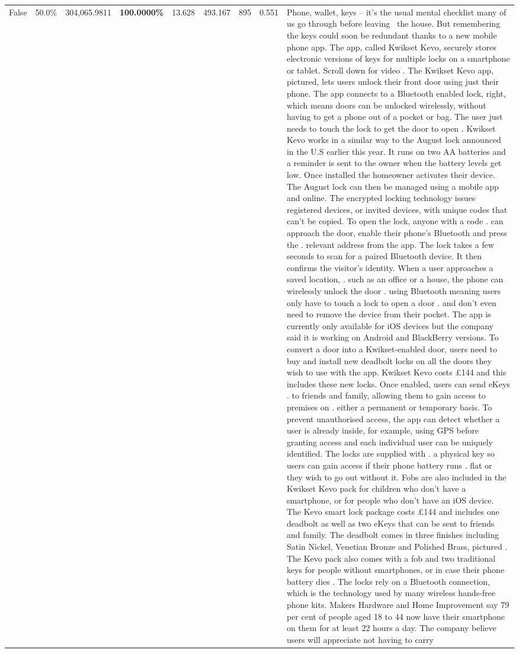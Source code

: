 \begin{table}[H]
\begin{tabular}{lllrlllll}
False & 50.0\% & \color{red} 304,065.9811 & \bfseries \color{red} 100.0000\% & 13.628 & 493.167 & 895 & 0.551 & Phone, wallet, keys – it’s the usual mental checklist many of us go through before leaving  the house. But remembering the keys could soon be redundant thanks to a new mobile phone app. The app, called Kwikset Kevo, securely stores electronic versions of keys for multiple locks on a smartphone or tablet. Scroll down for video . The Kwikset Kevo app, pictured, lets users unlock their front door using just their phone. The app connects to a Bluetooth enabled lock, right, which means doors can be unlocked wirelessly, without having to get a phone out of a pocket or bag. The user just needs to touch the lock to get the door to open . Kwikset Kevo works in a similar way to the August lock announced in the U.S earlier this year. It runs on two AA batteries and a reminder is sent to the owner when the battery levels get low. Once installed the homeowner activates their device. The August lock can then be managed using a mobile app and online. The encrypted locking technology issues registered devices, or invited devices, with unique codes that can't be copied. To open the lock, anyone with a code . can approach the door, enable their phone's Bluetooth and press the . relevant address from the app. The lock takes a few seconds to scan for a paired Bluetooth device. It then confirms the visitor's identity. When a user approaches a saved location, . such as an office or a house, the phone can wirelessly unlock the door . using Bluetooth meaning users only have to touch a lock to open a door . and don't even need to remove the device from their pocket. The app is currently only available for iOS devices but the company said it is working on Android and BlackBerry versions. To convert a door into a Kwikset-enabled door, users need to buy and install new deadbolt locks on all the doors they wish to use with the app. Kwikset Kevo costs £144 and this includes these new locks. Once enabled, users can send eKeys . to friends and family, allowing them to gain access to premises on . either a permanent or temporary basis. To prevent unauthorised access, the app can detect whether a user is already inside, for example, using GPS before granting access and each individual user can be uniquely identified. The locks are supplied with . a physical key so users can gain access if their phone battery runs . flat or they wish to go out without it. Fobs are also included in the Kwikset Kevo pack for children who don't have a smartphone, or for people who don't have an iOS device. The Kevo smart lock package costs £144 and includes one deadbolt as well as two eKeys that can be sent to friends and family. The deadbolt comes in three finishes including Satin Nickel, Venetian Bronze and Polished Brass, pictured . The Kevo pack also comes with a fob and two traditional keys for people without smartphones, or in case their phone battery dies . The locks rely on a Bluetooth connection, which is the technology used by many wireless hands-free phone kits. Makers Hardware and Home Improvement say 79 per cent of people aged 18 to 44 now have their smartphone on them for at least 22 hours a day. The company believe users will appreciate not having to carry 
\end{tabular}
\end{table}
